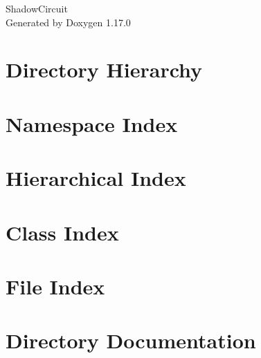 \documentclass[twoside]{book}
\newcommand{\+}{\discretionary{\mbox{\scriptsize$\hookleftarrow$}}{}{}}
\newcommand{\clearemptydoublepage}{%
    \newpage{\pagestyle{empty}\cleardoublepage}%
  }
\begin{document}
  \raggedbottom
    \hypersetup{pageanchor=false,
                bookmarksnumbered=true,
                pdfencoding=unicode
               }
  \begin{titlepage}
  \vspace*{7cm}
  \begin{center}%
  {\Large Shadow\+Circuit}\\
  \vspace*{1cm}
  {\large Generated by Doxygen 1.17.0}\\
  \end{center}
  \end{titlepage}
  \clearemptydoublepage
  \tableofcontents
  \clearemptydoublepage
  \hypersetup{pageanchor=true}
\chapter{Directory Hierarchy}

\chapter{Namespace Index}

\chapter{Hierarchical Index}

\chapter{Class Index}

\chapter{File Index}

\chapter{Directory Documentation}












\end{document}
